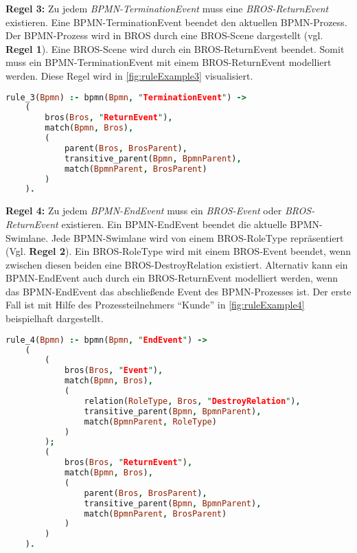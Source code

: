 \textbf{Regel 3:}
Zu jedem \emph{BPMN-TerminationEvent} muss eine \emph{BROS-ReturnEvent} existieren.
Eine BPMN-TerminationEvent beendet den aktuellen BPMN-Prozess.
Der BPMN-Prozess wird in BROS durch eine BROS-Scene dargestellt (vgl. \textbf{Regel 1}).
Eine BROS-Scene wird durch ein BROS-ReturnEvent beendet.
Somit muss ein BPMN-TerminationEvent mit einem BROS-ReturnEvent modelliert werden.
Diese Regel wird in \cref{fig:ruleExample3} visualisiert.

\begin{lstlisting}[language=Prolog, caption=Formalisierung der Regel 3, label=lst:rule_3]
rule_3(Bpmn) :- bpmn(Bpmn, "TerminationEvent") ->
    (
        bros(Bros, "ReturnEvent"), 
        match(Bpmn, Bros),
        (
            parent(Bros, BrosParent),
            transitive_parent(Bpmn, BpmnParent),
            match(BpmnParent, BrosParent)
        )
    ).
\end{lstlisting}

\textbf{Regel 4:}
Zu jedem \emph{BPMN-EndEvent} muss ein \emph{BROS-Event} oder \emph{BROS-ReturnEvent} existieren.
Ein BPMN-EndEvent beendet die aktuelle BPMN-Swimlane.
Jede BPMN-Swimlane wird von einem BROS-RoleType repräsentiert (Vgl. \textbf{Regel 2}).
Ein BROS-RoleType wird mit einem BROS-Event beendet, wenn zwischen diesen beiden eine BROS-DestroyRelation existiert.
Alternativ kann ein BPMN-EndEvent auch durch ein BROS-ReturnEvent modelliert werden, wenn das BPMN-EndEvent das abschließende Event des BPMN-Prozesses ist.
Der erste Fall ist mit Hilfe des Prozessteilnehmers ``Kunde'' in \cref{fig:ruleExample4} beispielhaft dargestellt.

\begin{lstlisting}[language=Prolog, caption=Formalisierung der Regel 4, label=lst:rule_4]
rule_4(Bpmn) :- bpmn(Bpmn, "EndEvent") ->
    (
        (
            bros(Bros, "Event"),
            match(Bpmn, Bros),
            (
                relation(RoleType, Bros, "DestroyRelation"),
                transitive_parent(Bpmn, BpmnParent),
                match(BpmnParent, RoleType)
            )
        );
        (
            bros(Bros, "ReturnEvent"), 
            match(Bpmn, Bros),
            (
                parent(Bros, BrosParent),
                transitive_parent(Bpmn, BpmnParent),
                match(BpmnParent, BrosParent)
            )
        )
    ).
\end{lstlisting}

